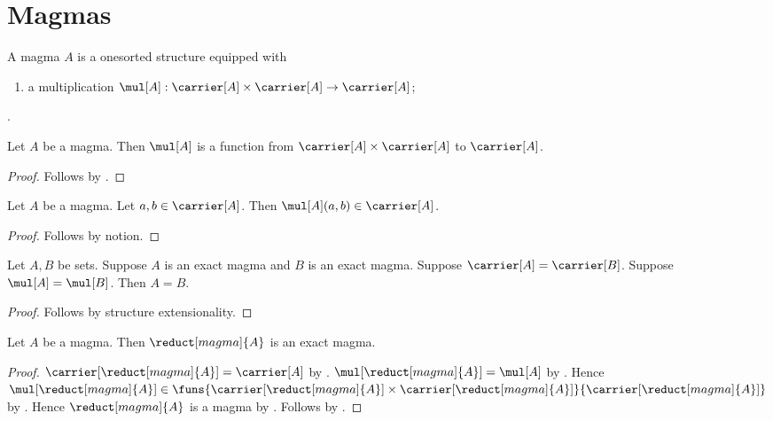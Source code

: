 

\section{Magmas}

\begin{struct}\label{magma}
    A magma $A$ is a onesorted structure equipped with
    \begin{enumerate}
        \item\label{magma_mul_graph}
            a multiplication
            $\mul[A]:\carrier[A]\times\carrier[A]\to\carrier[A]$;
    \end{enumerate}.
\end{struct}

\begin{classification}\label{magma_mul_function}
    Let $A$ be a magma.
    Then $\mul[A]$ is a function from
        $\carrier[A]\times\carrier[A]$ to $\carrier[A]$.
\end{classification}
\begin{proof}
    Follows by .
\end{proof}

\begin{proposition}\label{magma_welldef}
    Let $A$ be a magma.
    Let $a,b\in\carrier[A]$.
    Then $\mul[A](a,b)\in\carrier[A]$.
\end{proposition}
\begin{proof}
    Follows by notion.
\end{proof}

\begin{theorem}\label{exact_magma_extensionality}
    Let $A,B$ be sets.
    Suppose $A$ is an exact magma and $B$ is an exact magma.
    Suppose $\carrier[A]=\carrier[B]$.
    Suppose $\mul[A]=\mul[B]$.
    Then $A=B$.
\end{theorem}
\begin{proof}
    Follows by structure extensionality.
\end{proof}

\begin{theorem}\label{magma_reduct_is_exact_magma}
    Let $A$ be a magma.
    Then $\reduct[magma]{A}$ is an exact magma.
\end{theorem}
\begin{proof}
    $\carrier[\reduct[magma]{A}]=\carrier[A]$ by
        .
    $\mul[\reduct[magma]{A}]=\mul[A]$ by
        .
    Hence $\mul[\reduct[magma]{A}]\in
        \funs{\carrier[\reduct[magma]{A}]\times
            \carrier[\reduct[magma]{A}]}{
            \carrier[\reduct[magma]{A}]}$ by
        .
    Hence $\reduct[magma]{A}$ is a magma by .
    Follows by .
\end{proof}

